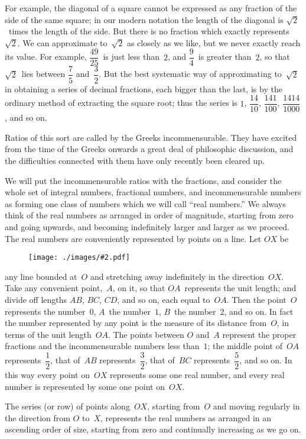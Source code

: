 \documentclass[12pt,leqno]{book}[2005/09/16]
\newcommand{\Graphic}[2]{%
  \phantomsection\label{fig:#2}%
  \texttt{[image: ./images/\#2.pdf]}%
}
\newcommand{\DefWidth}{4in}%
\newcommand{\Diagram}[1]{%
  \begin{figure}[hbt!]
    \centering
    \Graphic{\DefWidth}{#1}
  \end{figure}\ignorespaces%
}
\newcommand{\PageSep}[1]{\ignorespaces}
\begin{document}
For example, the diagonal of a square cannot
be expressed as any fraction of the side of the
same square; in our modern notation the
length of the diagonal is $\sqrt{2}$~times the length
of the side. But there is no fraction which
exactly represents~$\sqrt{2}$. We can approximate
\PageSep{73}
to~$\sqrt{2}$ as closely as we like, but we never
exactly reach its value. For example, $\dfrac{49}{25}$~is
just less than~$2$, and $\dfrac{9}{4}$~is greater than~$2$, so
that $\sqrt{2}$~lies between $\dfrac{7}{5}$ and~$\dfrac{3}{2}$. But the best
systematic way of approximating to~$\sqrt{2}$ in
obtaining a series of decimal fractions, each
bigger than the last, is by the ordinary method
of extracting the square root; thus the series
is $1$, $\dfrac{14}{10}$, $\dfrac{141}{100}$, $\dfrac{1414}{1000}$, and so on.

Ratios of this sort are called by the Greeks
incommensurable. They have excited from
the time of the Greeks onwards a great deal
of philosophic discussion, and the difficulties
connected with them have only recently been
cleared up.

We will put the incommensurable ratios
%
with the fractions, and consider the whole
set of integral numbers, fractional numbers,
and incommensurable numbers as forming
one class of numbers which we will call ``real
numbers.'' We always think of the real
numbers as arranged in order of magnitude,
starting from zero and going upwards, and
becoming indefinitely larger and larger as we
proceed. The real numbers are conveniently
\PageSep{74}
represented by points on a line. Let $OX$ be
\Diagram{pg76}
any line bounded at~$O$ and stretching away indefinitely
in the direction~$OX$. Take any convenient
point,~$A$, on it, so that $OA$~represents
the unit length; and divide off lengths $AB$,
$BC$, $CD$, and so on, each equal to~$OA$. Then
the point~$O$ represents the number~$0$, $A$~the
number~$1$, $B$~the number~$2$, and so on. In
fact the number represented by any point is
the measure of its distance from~$O$, in terms
of the unit length~$OA$. The points between
$O$ and~$A$ represent the proper fractions and
the incommensurable numbers less than~$1$;
the middle point of~$OA$ represents~$\dfrac{1}{2}$, that of~$AB$
represents~$\dfrac{3}{2}$, that of~$BC$ represents~$\dfrac{5}{2}$, and
so on. In this way every point on~$OX$ represents
some one real number, and every real
number is represented by some one point on~$OX$.

The series (or row) of points along~$OX$,
%
starting from~$O$ and moving regularly in the
direction from $O$ to~$X$, represents the real
numbers as arranged in an ascending order
\PageSep{75}
of size, starting from zero and continually
increasing as we go on.
\end{document}
